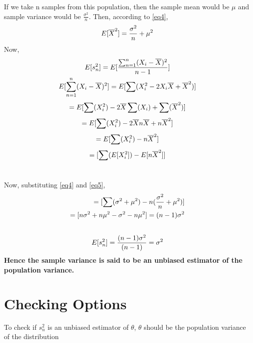 \documentclass[12pt]{article}
\begin{document}
If we take n samples from this population, then the sample mean would be $\mu$ and sample variance would be $\frac{\sigma^{2}}{n}$. Then, according to \ref{eq4}, \\
\begin{equation} \label{eq5}
    E[\overline{X}^{2}] = \frac{\sigma^{2}}{n} + \mu^{2}\\
\end{equation}
Now, 
\begin{gather*}
   E [s^{2}_{n}] = E[\frac{\sum_{n=1}^{n}(X_{i} - \overline{X})^{2}} {n-1}] \\
    \vspace{0.1cm}
    E[\sum_{n=1}^{n}(X_{i} - \overline{X})^{2}] = E[\sum(X_{i}^{2}-2X_{i}\overline{X} + \overline{X}^{2})] \\ \vspace{0.1cm}
    = E[\sum(X_{i}^{2}) - 2\overline{X}\sum(X_{i})+\sum(\overline{X}^{2})] \\
    \vspace{0.1cm}
    = E[\sum(X_{i}^{2}) - 2\overline{X}n\overline{X} + n\overline{X}^{2}] \\
    \vspace{0.1cm}
    = E[\sum(X_{i}^{2}) - n\overline{X}^{2}] \\
    \vspace{0.1cm}
    = [\sum(E[X_{i}^{2}]) - E[n\overline{X}^{2}]] \\
    \vspace{0.1cm}
\end{gather*}
Now, substituting \ref{eq4} and \ref{eq5}, \\
\begin{align*}
    = [\sum(\sigma^{2}+\mu^{2}) - n(\frac{\sigma^{2}}{n} + \mu^{2})] \\
    \vspace{0.1cm}
    = [n\sigma^{2} + {n\mu^{2}} - \sigma^{2} - {n\mu^{2}}] = (n-1)\sigma^{2} \\
    \vspace{0.1cm}
\end{align*}
\begin{equation}
     E [s^{2}_{n}] = \frac{(n-1)\sigma^{2}}{(n-1)} = \sigma^{2}\\
\end{equation}
\textbf{Hence the sample variance is said to be an unbiased estimator of the population variance.}
\section{Checking Options}
To check if $s_{n}^{2}$ is an unbiased estimator of $\theta$, $\theta$ should be the population variance of the distribution
\end{document}
